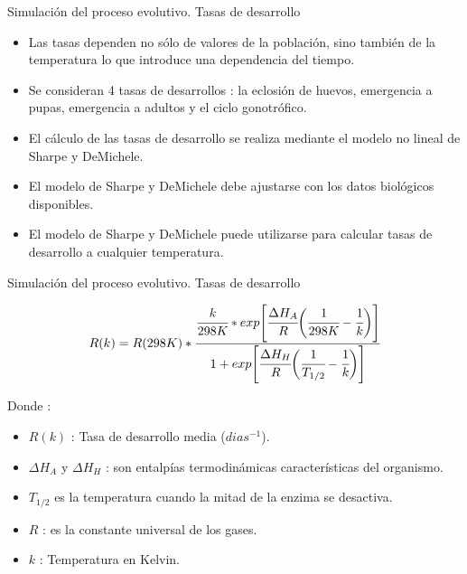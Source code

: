 \begin{frame}[c]{Simulación del proceso evolutivo. Tasas de desarrollo}
  \begin{itemize}
    \item Las tasas dependen no sólo de valores de la población, sino también de la temperatura lo que introduce una dependencia del tiempo.
    \item Se consideran 4 tasas de desarrollos : la eclosión de huevos, emergencia a pupas, emergencia a adultos y el ciclo gonotrófico.
    \item El cálculo de las tasas de desarrollo se realiza mediante el modelo no lineal de Sharpe y DeMichele.
    \item El modelo de Sharpe y DeMichele debe ajustarse con los datos biológicos disponibles.
    \item El modelo de Sharpe y DeMichele puede utilizarse para calcular tasas de desarrollo a cualquier temperatura.
  \end{itemize}
\end{frame}

\begin{frame}[c]{Simulación del proceso evolutivo. Tasas de desarrollo}
\begin{center}
    \begin{equation} \label{eq:schoolfield}
       R(k)  = R(298K) *\cfrac{ \cfrac{k}{298K} *
        exp \Bigg[
                \cfrac{\Delta H_{A}}{R} \bigg(\cfrac{1}{298K} - \cfrac{1}{k}\bigg)
            \Bigg]}
        {1 + exp\Bigg[\cfrac{\Delta H_{H}}{R} \bigg(\cfrac{1}{T_{1/2}}- \cfrac{1}{k}\bigg)\Bigg] }
    \end{equation}
\end{center}
Donde :
 \begin{itemize}
    \item $R(k)$ : Tasa de desarrollo media ($dias^{-1}$).
    \item $\Delta H_{A}$ y $\Delta H_{H}$ : son entalpías termodinámicas características del organismo.
    \item $T_{1/2}$ es la temperatura cuando la mitad de la enzima se desactiva.
    \item $R$ : es la constante universal de los gases.
    \item $k$ : Temperatura en Kelvin.
    \end{itemize}
\end{frame}

